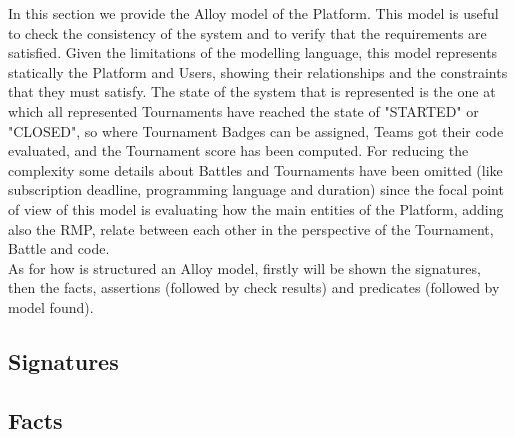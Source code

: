 \newcommand{\showCode}[2]{
    
}
In this section we provide the Alloy model of the Platform. This model is useful to check the consistency of the system and to verify that the requirements are satisfied. Given the limitations of the modelling language, this model represents statically the Platform and Users, showing their relationships and the constraints that they must satisfy. The state of the system that is represented is the one at which all represented Tournaments have reached the state of "STARTED" or "CLOSED", so where Tournament Badges can be assigned, Teams got their code evaluated, and the Tournament score has been computed. For reducing the complexity some details about Battles and Tournaments have been omitted (like subscription deadline, programming language and duration) since the focal point of view of this model is evaluating how the main entities of the Platform, adding also the RMP, relate between each other in the perspective of the Tournament, Battle and code.\\
As for how is structured an Alloy model, firstly will be shown the signatures, then the facts, assertions (followed by check results) and predicates (followed by model found).

\subsection{Signatures}
\showCode{4}{76}
\subsection{Facts}
\showCode{82}{238}
